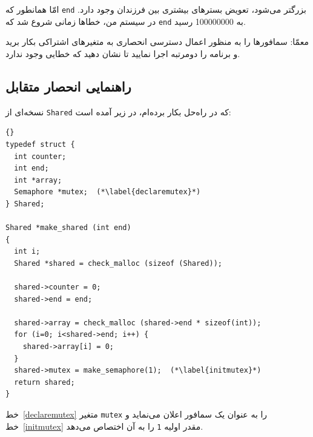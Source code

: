 \documentclass{book}
\newcommand{\clearemptydoublepage}{\newpage\cleardoublepage}
\begin{document}
    امّا همانطور که {\tt end}  بزرگتر می‌شود، تعویض بسترهای بیشتری بین فرزندان وجود دارد. 
    در سیستم من، خطاها زمانی شروع شد که {\tt end} به  100000000 رسید. 

    معمّا:‌ سمافورها را به منظور اعمال دسترسی انحصاری به متغیرهای اشتراکی بکار برید و برنامه را دومرتبه اجرا نمایید تا نشان دهید که خطایی وجود ندارد. 
    

\clearemptydoublepage
\subsection{راهنمایی انحصار متقابل}

    نسخه‌ای از {\tt Shared} که در راه‌حل بکار برده‌ام، در زیر آمده است:

\begin{latin}
\begin{lstlisting}[title={}]{}
typedef struct {
  int counter;
  int end;
  int *array;
  Semaphore *mutex;  (*\label{declaremutex}*)
} Shared;

Shared *make_shared (int end)
{
  int i;
  Shared *shared = check_malloc (sizeof (Shared));

  shared->counter = 0;
  shared->end = end;

  shared->array = check_malloc (shared->end * sizeof(int));
  for (i=0; i<shared->end; i++) {
    shared->array[i] = 0;
  }
  shared->mutex = make_semaphore(1);  (*\label{initmutex}*)
  return shared;
}
\end{lstlisting}
\end{latin}

    خط~\ref{declaremutex} متغیر  {\tt mutex} را به عنوان یک سمافور اعلان می‌نماید و 
    خط~\ref{initmutex} مقدر اولیه  {\tt 1} را به آن اختصاص می‌دهد. 

\end{document}
